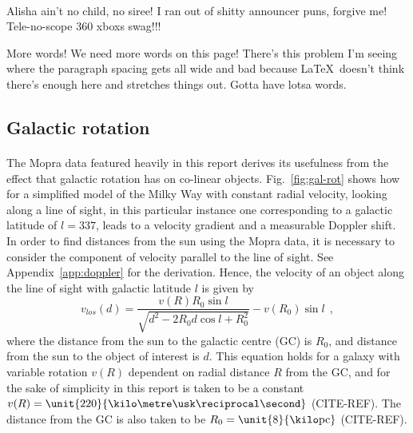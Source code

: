 \documentclass[a4paper, titlepage, oneside]{article}
\newcommand{\parsec}{\mathrm{pc}}
\begin{document}
\begin{multicols}{2}
\paragraph{}
Alisha ain't no child, no siree! I ran out of shitty announcer puns, forgive me! Tele-no-scope 360 xboxs swag!!!

More words! We need more words on this page! There's this problem I'm seeing where the paragraph spacing gets all wide and bad because \LaTeX~doesn't think there's enough here and stretches things out. Gotta have lotsa words.

\subsection{Galactic rotation}
\label{sec:gal-rot}
\paragraph{}
The Mopra data featured heavily in this report \parencite{Burton:2013} derives its usefulness from the effect that galactic rotation has on co-linear objects. Fig.~\ref{fig:gal-rot} shows how for a simplified model of the Milky Way with constant radial velocity, looking along a line of sight, in this particular instance one corresponding to a galactic latitude of \(l=337\), leads to a velocity gradient and a measurable Doppler shift. In order to find distances from the sun using the Mopra data, it is necessary to consider the component of velocity parallel to the line of sight. See Appendix~\ref{app:doppler} for the derivation. Hence, the velocity of an object along the line of sight with galactic latitude \(l\) is given by
\begin{equation}
  v_{los}(d)=\frac{v(R)R_0\sin{l}}{\sqrt{d^2-2R_0d\cos{l}+R_0^2}}-v(R_0)\sin{l}\;\,,
\end{equation}
where the distance from the sun to the galactic centre (GC) is \(R_0\), and distance from the sun to the object of interest is \(d\). This equation holds for a galaxy with variable rotation \(v(R)\) dependent on radial distance \(R\) from the GC, and for the sake of simplicity in this report is taken to be a constant \(v(R)=\unit{220}{\kilo\metre\usk\reciprocal\second}\) (CITE-REF). The distance from the GC is also taken to be \(R_0=\unit{8}{\kilo\parsec}\) (CITE-REF).


\end{multicols}
\end{document}
